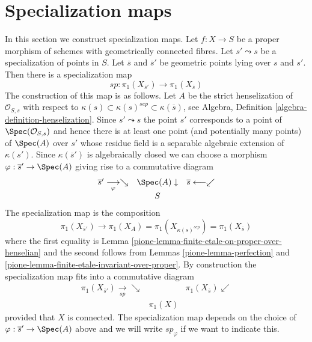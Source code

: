\section{Specialization maps}
\label{pione-section-specialization-map}
In this section we construct specialization maps.
Let $f : X \to S$ be a proper morphism of schemes
with geometrically connected fibres.
Let $s' \leadsto s$ be a specialization of points in $S$.
Let $\overline{s}$ and $\overline{s}'$ be geometric points
lying over $s$ and $s'$. Then there is a specialization map
$$
sp : \pi_1(X_{\overline{s}'}) \longrightarrow \pi_1(X_{\overline{s}})
$$
The construction of this map is as follows. Let $A$ be the
strict henselization of $\mathcal{O}_{S, s}$ with respect to
$\kappa(s) \subset \kappa(s)^{sep} \subset \kappa(\overline{s})$, see
Algebra, Definition \ref{algebra-definition-henselization}.
Since $s' \leadsto s$ the point $s'$ corresponds to a point of
$\Spec(\mathcal{O}_{S, s})$ and hence there is at least one point
(and potentially many points)
of $\Spec(A)$ over $s'$ whose residue field is a separable algebraic
extension of $\kappa(s')$.
Since $\kappa(\overline{s}')$ is algebraically closed we can choose
a morphism $\varphi : \overline{s}' \to \Spec(A)$ giving rise to a commutative
diagram
$$
\begin{array}{ccc}\overline{s}' \underset{\varphi}{\longrightarrow}\searrow & \Spec(A) \downarrow & \overline{s} \longleftarrow\swarrow \\  & S & \end{array}
$$
The specialization map is the composition
$$
\pi_1(X_{\overline{s}'}) \longrightarrow
\pi_1(X_A) =
\pi_1(X_{\kappa(s)^{sep}}) =
\pi_1(X_{\overline{s}})
$$
where the first equality is
Lemma \ref{pione-lemma-finite-etale-on-proper-over-henselian}
and the second follows from
Lemmas \ref{pione-lemma-perfection} and
\ref{pione-lemma-finite-etale-invariant-over-proper}.
By construction the specialization map fits into a commutative
diagram
$$
\begin{array}{ccc}\pi_1(X_{\overline{s}'}) \underset{sp}{\longrightarrow}\searrow &  & \pi_1(X_{\overline{s}}) \swarrow \\  & \pi_1(X) & \end{array}
$$
provided that $X$ is connected. The specialization map depends on the
choice of $\varphi : \overline{s}' \to \Spec(A)$ above and we will
write $sp_\varphi$ if we want to indicate this.

